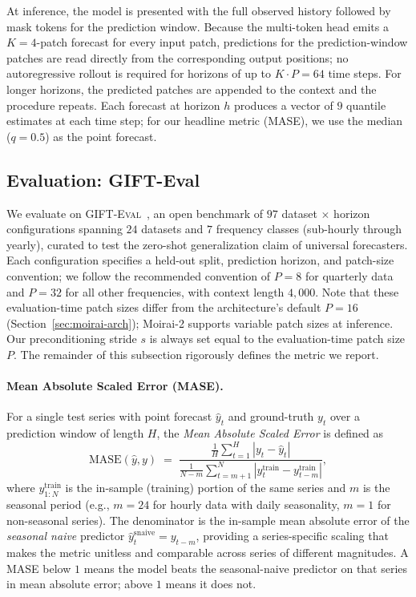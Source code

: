 \documentclass[11pt]{article}
\theoremstyle{plain}
\theoremstyle{definition}
\theoremstyle{remark}
\newcommand{\abs}[1]{\left\lvert#1\right\rvert}
\begin{document}
At inference, the model is presented with the full observed history followed by mask tokens for the prediction window. Because the multi-token head emits a $K{=}4$-patch forecast for every input patch, predictions for the prediction-window patches are read directly from the corresponding output positions; no autoregressive rollout is required for horizons of up to $K \cdot P = 64$ time steps. For longer horizons, the predicted patches are appended to the context and the procedure repeats. Each forecast at horizon $h$ produces a vector of $9$ quantile estimates at each time step; for our headline metric (MASE), we use the median ($q = 0.5$) as the point forecast.

\subsection{Evaluation: GIFT-Eval}
\label{sec:gifteval}

We evaluate on \textsc{GIFT-Eval}~\citep{vijay2024gifteval}, an open benchmark of $97$ dataset $\times$ horizon configurations spanning $24$ datasets and $7$ frequency classes (sub-hourly through yearly), curated to test the zero-shot generalization claim of universal forecasters. Each configuration specifies a held-out split, prediction horizon, and patch-size convention; we follow the recommended convention of $P = 8$ for quarterly data and $P = 32$ for all other frequencies, with context length $4{,}000$. Note that these evaluation-time patch sizes differ from the architecture's default $P = 16$ (Section~\ref{sec:moirai-arch}); Moirai-2 supports variable patch sizes at inference. Our preconditioning stride $s$ is always set equal to the evaluation-time patch size $P$. The remainder of this subsection rigorously defines the metric we report.

\paragraph{Mean Absolute Scaled Error (MASE).}
For a single test series with point forecast $\hat y_{t}$ and ground-truth $y_{t}$ over a prediction window of length $H$, the \emph{Mean Absolute Scaled Error} \citep{hyndman2006another} is defined as
\begin{equation}
    \mathrm{MASE}(\hat y, y) \;=\; \frac{\frac{1}{H}\sum_{t=1}^{H} \abs{y_t - \hat y_t}}{\frac{1}{N - m}\sum_{t = m+1}^{N} \abs{y^{\text{train}}_t - y^{\text{train}}_{t-m}}},
    \label{eq:mase-def}
\end{equation}
where $y^{\text{train}}_{1:N}$ is the in-sample (training) portion of the same series and $m$ is the seasonal period (e.g., $m = 24$ for hourly data with daily seasonality, $m = 1$ for non-seasonal series). The denominator is the in-sample mean absolute error of the \emph{seasonal naive} predictor $\hat y_t^{\text{snaive}} = y_{t-m}$, providing a series-specific scaling that makes the metric unitless and comparable across series of different magnitudes. A MASE below $1$ means the model beats the seasonal-naive predictor on that series in mean absolute error; above $1$ means it does not.
\end{document}
